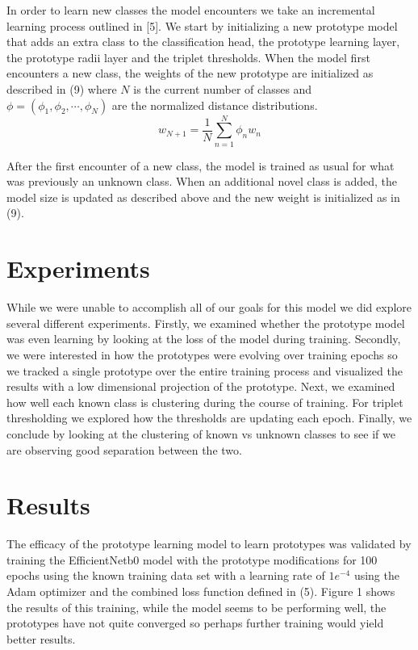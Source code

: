 \documentclass[conference]{IEEEtran}
\begin{document}
In order to learn new classes the model encounters we take an incremental learning process outlined in [5]. We start by initializing a new prototype model that adds an extra class to the classification head, the prototype learning layer, the prototype radii layer and the triplet thresholds. When the model first encounters a new class, the weights of the new prototype are initialized as described in (9) where $N$ is the current number of classes and $\phi = (\phi_1, \phi_2, \cdots, \phi_N)$ are the normalized distance distributions.
\begin{equation}
w_{N+1} = \frac{1}{N}  \sum_{n = 1}^N \phi_n w_n
\end{equation}

After the first encounter of a new class, the model is trained as usual for what was previously an unknown class. When an additional novel class is added, the model size is updated as described above and the new weight is initialized as in (9).

\section{Experiments}

While we were unable to accomplish all of our goals for this model we did explore several different experiments. Firstly, we examined whether the prototype model was even learning by looking at the loss of the model during training. Secondly, we were interested in how the prototypes were evolving over training epochs so we tracked a single prototype over the entire training process and visualized the results with a low dimensional projection of the prototype. Next, we examined how well each known class is clustering during the course of training. For triplet thresholding we explored how the thresholds are updating each epoch. Finally, we conclude by looking at the clustering of known vs unknown classes to see if we are observing good separation between the two. 

\section{Results}

The efficacy of the prototype learning model to learn prototypes was validated by training the EfficientNetb0 model with the prototype modifications for 100 epochs using the known training data set with a learning rate of $1e^{-4}$ using the Adam optimizer and the combined loss function defined in (5). Figure 1 shows the results of this training, while the model seems to be performing well, the prototypes have not quite converged so perhaps further training would yield better results.\\
\end{document}
